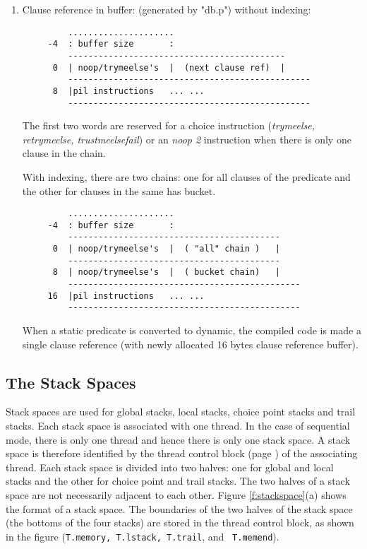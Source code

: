 \documentclass[11pt]{article}
\begin{document}
\begin{enumerate}
    \item Clause reference in buffer: (generated by "db.p")
\label{pg:clauseref}
        without indexing:

\begin{verbatim}
         .....................
     -4  : buffer size       :
         -------------------------------------------
      0  | noop/trymeelse's  |  (next clause ref)  |
         ------------------------------------------------
      8  |pil instructions   ... ...
         ------------------------------------------------
\end{verbatim}

	The first two words are reserved for a choice instruction
	({\it trymeelse, retrymeelse, trustmeelsefail}) or an {\it noop 2}
	instruction when there is only one clause in the chain.

        With indexing, there are two chains: one for all clauses
	of the predicate and the other for clauses in the same has bucket.

\begin{verbatim}
         .....................
     -4  : buffer size       :
         ------------------------------------------
      0  | noop/trymeelse's  |  ( "all" chain )   |
         ------------------------------------------
      8  | noop/trymeelse's  |  ( bucket chain)   |
         ----------------------------------------------
     16  |pil instructions   ... ...
         ----------------------------------------------
\end{verbatim}

	When a static predicate is converted to dynamic, the compiled
	code is made a single clause reference (with newly allocated
	16 bytes clause reference buffer).
\end{enumerate}


\subsection{The Stack Spaces}

Stack spaces are used for global stacks, local stacks, choice point
stacks and trail stacks.  Each stack space is associated with one
thread. In the case of sequential mode, there is only one thread and
hence there is only one stack space.  A stack space is therefore
identified by the thread control block (page \pageref{pg:tcb}) of the
associating thread.  Each stack space is divided into two halves: one
for global and local stacks and the other for choice point and trail
stacks.  The two halves of a stack space are not necessarily adjacent
to each other.  Figure \ref{f:stackspace}(a) shows the format of a
stack space.  The boundaries of the two halves of the stack space (the
bottoms of the four stacks) are stored in the thread control block, as
shown in the figure ({\tt T.memory, T.lstack, T.trail}, and {\tt
T.memend}).
\end{document}
